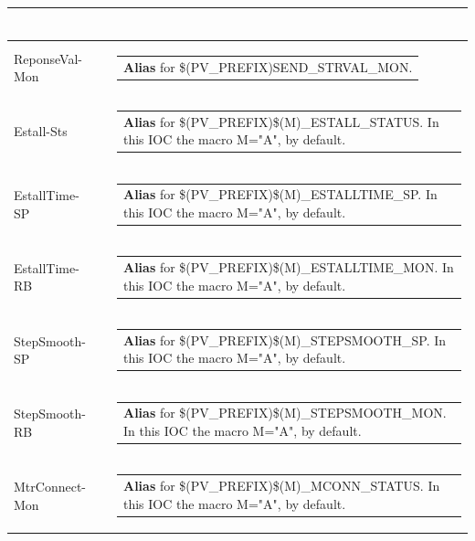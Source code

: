 \documentclass[openany]{article}
\begin{document}
\begin{longtable}{| m{4.5cm} m{2.5cm}  m{8.5cm} |}
\begin{tabular}{@{}m{6cm}@{}}
            \end{tabular} \hypertarget{pv:response-val-mon}{}\\ \hline
        ReponseVal-Mon &  & \begin{tabular}{@{}m{6cm}@{}}
                \textbf{\color{blue} Alias} for \$(PV\_PREFIX)SEND\_STRVAL\_MON.
            \end{tabular} \hypertarget{pv:estall}{}\\ \hline
        Estall-Sts &  & \begin{tabular}{@{}m{6cm}@{}}
                \textbf{\color{blue} Alias} for \$(PV\_PREFIX)\$(M)\_ESTALL\_STATUS. In this IOC the macro M="A", by default.
            \end{tabular} \hypertarget{pv:estall-time}{}\\ \hline
        EstallTime-SP &  & \begin{tabular}{@{}m{6cm}@{}}
                \textbf{\color{blue} Alias} for \$(PV\_PREFIX)\$(M)\_ESTALLTIME\_SP. In this IOC the macro M="A", by default.
            \end{tabular} \hypertarget{}{}\\ \hline
        EstallTime-RB &  & \begin{tabular}{@{}m{6cm}@{}}
                \textbf{\color{blue} Alias} for \$(PV\_PREFIX)\$(M)\_ESTALLTIME\_MON. In this IOC the macro M="A", by default.
            \end{tabular} \hypertarget{pv:step-smooth}{}\\ \hline
        StepSmooth-SP &  & \begin{tabular}{@{}m{6cm}@{}}
                \textbf{\color{blue} Alias} for \$(PV\_PREFIX)\$(M)\_STEPSMOOTH\_SP. In this IOC the macro M="A", by default.
            \end{tabular} \hypertarget{}{}\\ \hline
        StepSmooth-RB &  & \begin{tabular}{@{}m{6cm}@{}}
                \textbf{\color{blue} Alias} for \$(PV\_PREFIX)\$(M)\_STEPSMOOTH\_MON. In this IOC the macro M="A", by default.
            \end{tabular} \hypertarget{pv:mtr-connect-mon}{}\\ \hline
        MtrConnect-Mon &  & \begin{tabular}{@{}m{6cm}@{}}
                \textbf{\color{blue} Alias} for \$(PV\_PREFIX)\$(M)\_MCONN\_STATUS. In this IOC the macro M="A", by default.

\end{tabular}
\end{longtable}
\end{document}
